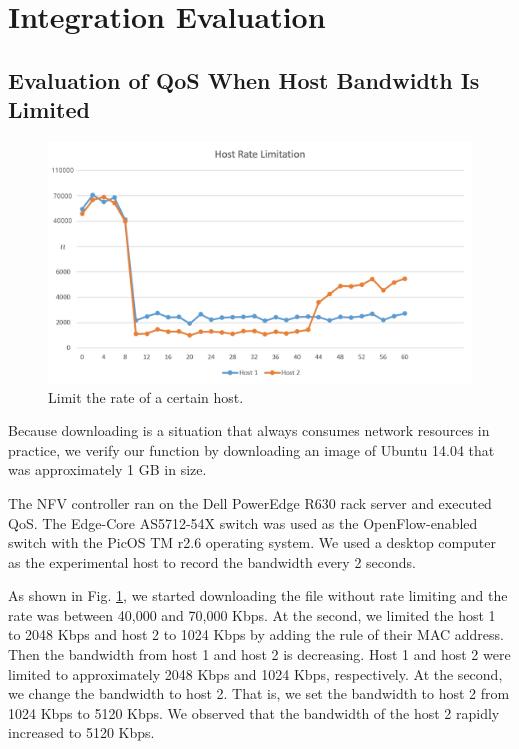 \section{Integration Evaluation}


\subsection{Evaluation of QoS When Host Bandwidth Is Limited}

\begin{figure}[!t]
\centering
\includegraphics[width=\textwidth]{./fig/integration_host.png}
\caption{Limit the rate of a certain host.}
\label{fig:integration_host}
\end{figure}

Because downloading is a situation that always consumes network resources in practice,
we verify our function by downloading an image of Ubuntu 14.04 that was approximately 1 GB in size.

The NFV controller ran on the Dell PowerEdge R630 rack server and executed QoS.
The Edge-Core AS5712-54X \cite{edge-core-switch} switch was used as the OpenFlow-enabled switch with the PicOS TM r2.6 operating system.
We used a desktop computer as the experimental host to record the bandwidth every 2 seconds.

As shown in Fig. \ref{fig:integration_host}, we started downloading the file without rate limiting and the rate was between 40,000 and 70,000 Kbps.
At the  second, we limited the host 1 to 2048 Kbps and host 2 to 1024 Kbps by adding the rule of their MAC address.
Then the bandwidth from host 1 and host 2 is decreasing.
Host 1 and host 2 were limited to approximately 2048 Kbps and 1024 Kbps, respectively.
At the  second, we change the bandwidth to host 2.
That is, we set the bandwidth to host 2 from 1024 Kbps to 5120 Kbps.
We observed that the bandwidth of the host 2 rapidly increased to 5120 Kbps.



